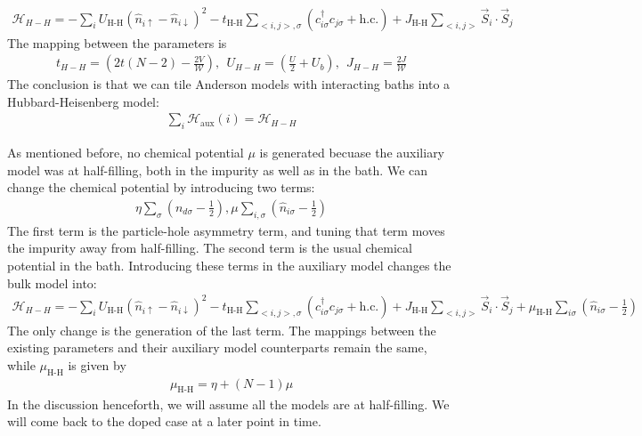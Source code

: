 \documentclass{report}
\numberwithin{equation}{section}
\begin{document}
\begin{equation}\begin{aligned}
	\mathcal{H}_{H-H} = -\sum_{i} U_\text{H-H} \left(\hat n_{i \uparrow} - \hat n_{i \downarrow} \right)^2 - t_\text{H-H}\sum_{<i,j>,\sigma}\left(c^\dagger_{i\sigma}c_{j\sigma} + \text{h.c.}\right) + J_\text{H-H}\sum_{<i,j>} \vec{S}_i\cdot\vec{S}_j
\end{aligned}\end{equation}
The mapping between the parameters is
\begin{equation}\begin{aligned}
	\label{map_aux_bulk}
	t_{H-H} = \left(2t (N-2) - \frac{2V}{\mathcal{W}}\right),~ ~ U_{H-H} = \left(\frac{U}{2} + U_b\right), ~ ~ J_{H-H} = \frac{2J}{\mathcal{W}}
\end{aligned}\end{equation}
The conclusion is that we can tile Anderson models with interacting baths into a Hubbard-Heisenberg model:
\begin{equation}\begin{aligned}
	\label{siam_to_hubb}
	\sum_i \mathcal{H}_\text{aux}(i) = \mathcal{H}_{H-H}
\end{aligned}\end{equation}

As mentioned before, no chemical potential \(\mu\) is generated becuase the auxiliary model was at half-filling, both in the impurity as well as in the bath. We can change the chemical potential by introducing two terms:
\begin{equation}\begin{aligned}
	\eta \sum_\sigma\left(n_{d\sigma} - \frac{1}{2}\right), \mu \sum_{i,\sigma}\left(\hat n_{i\sigma} - \frac{1}{2}\right)
\end{aligned}\end{equation}
The first term is the particle-hole asymmetry term, and tuning that term moves the impurity away from half-filling. The second term is the usual chemical potential in the bath. Introducing these terms in the auxiliary model changes the bulk model into:
\begin{equation}\begin{aligned}
	\mathcal{H}_{H-H} = -\sum_{i} U_\text{H-H} \left(\hat n_{i \uparrow} - \hat n_{i \downarrow} \right)^2 - t_\text{H-H}\sum_{<i,j>,\sigma}\left(c^\dagger_{i\sigma}c_{j\sigma} + \text{h.c.}\right) + J_\text{H-H}\sum_{<i,j>} \vec{S}_i\cdot\vec{S}_j + \mu_\text{H-H}\sum_{i\sigma}\left(\hat n_{i\sigma} - \frac{1}{2}\right) 
\end{aligned}\end{equation}
The only change is the generation of the last term. The mappings between the existing parameters and their auxiliary model counterparts remain the same, while \(\mu_\text{H-H}\) is given by
\begin{equation}\begin{aligned}
	\mu_\text{H-H} = \eta + \left(N-1\right) \mu
\end{aligned}\end{equation}
In the discussion henceforth, we will assume all the models are at half-filling. We will come back to the doped case at a later point in time.
\end{document}
